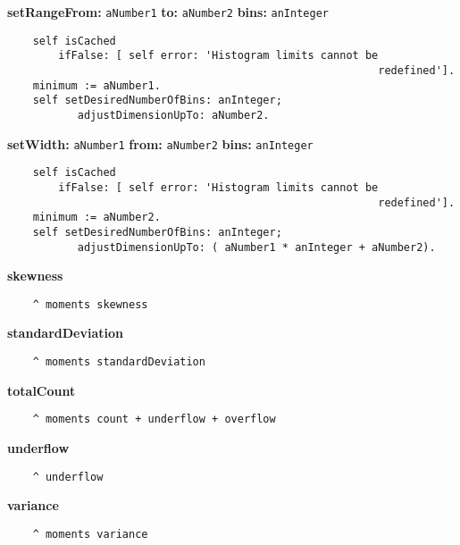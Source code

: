 {\bf setRangeFrom:} {\tt aNumber1} {\bf to:} {\tt aNumber2} {\bf bins:} {\tt anInteger}
\begin{verbatim}
    self isCached
        ifFalse: [ self error: 'Histogram limits cannot be 
                                                          redefined'].
    minimum := aNumber1.
    self setDesiredNumberOfBins: anInteger;
           adjustDimensionUpTo: aNumber2.
\end{verbatim}
{\bf setWidth:} {\tt aNumber1} {\bf from:} {\tt aNumber2} {\bf bins:} {\tt anInteger}
\begin{verbatim}
    self isCached
        ifFalse: [ self error: 'Histogram limits cannot be 
                                                          redefined'].
    minimum := aNumber2.
    self setDesiredNumberOfBins: anInteger;
           adjustDimensionUpTo: ( aNumber1 * anInteger + aNumber2).
\end{verbatim}
{\bf skewness}
\begin{verbatim}
    ^ moments skewness
\end{verbatim}
{\bf standardDeviation}
\begin{verbatim}
    ^ moments standardDeviation
\end{verbatim}
{\bf totalCount}
\begin{verbatim}
    ^ moments count + underflow + overflow
\end{verbatim}
{\bf underflow}
\begin{verbatim}
    ^ underflow
\end{verbatim}
{\bf variance}
\begin{verbatim}
    ^ moments variance
\end{verbatim}

